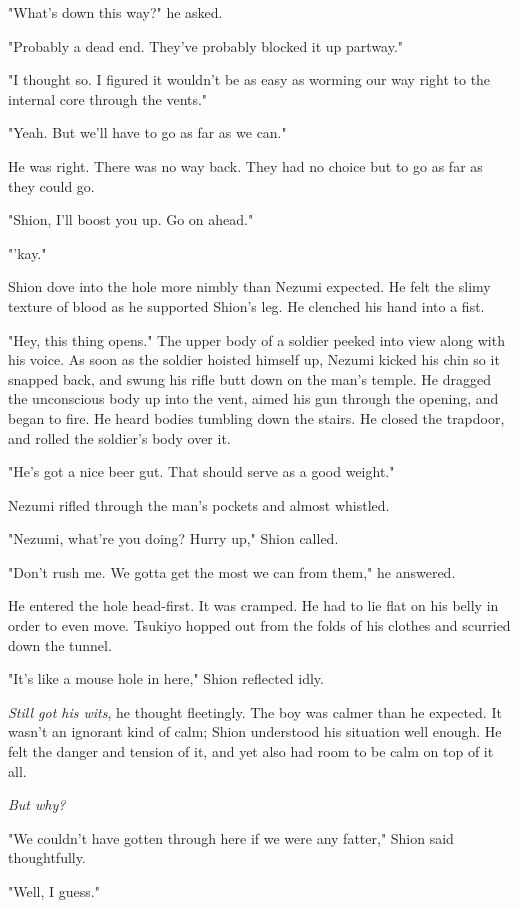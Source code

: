 "What's down this way?" he asked.

"Probably a dead end. They've probably blocked it up partway."

"I thought so. I figured it wouldn't be as easy as worming our way right
to the internal core through the vents."

"Yeah. But we'll have to go as far as we can."

He was right. There was no way back. They had no choice but to go as far
as they could go.

"Shion, I'll boost you up. Go on ahead."

"'kay."

Shion dove into the hole more nimbly than Nezumi expected. He felt the
slimy texture of blood as he supported Shion's leg. He clenched his hand
into a fist.

"Hey, this thing opens." The upper body of a soldier peeked into view
along with his voice. As soon as the soldier hoisted himself up, Nezumi
kicked his chin so it snapped back, and swung his rifle butt down on the
man's temple. He dragged the unconscious body up into the vent, aimed
his gun through the opening, and began to fire. He heard bodies tumbling
down the stairs. He closed the trapdoor, and rolled the soldier's body
over it.

"He's got a nice beer gut. That should serve as a good weight."

Nezumi rifled through the man's pockets and almost whistled.

"Nezumi, what're you doing? Hurry up," Shion called.

"Don't rush me. We gotta get the most we can from them," he answered.

He entered the hole head-first. It was cramped. He had to lie flat on
his belly in order to even move. Tsukiyo hopped out from the folds of
his clothes and scurried down the tunnel.

"It's like a mouse hole in here," Shion reflected idly.

\emph{Still got his wits}, he thought fleetingly. The boy was calmer than he
expected. It wasn't an ignorant kind of calm; Shion understood his
situation well enough. He felt the danger and tension of it, and yet
also had room to be calm on top of it all.

\emph{But why?}

"We couldn't have gotten through here if we were any fatter," Shion said
thoughtfully.

"Well, I guess."

